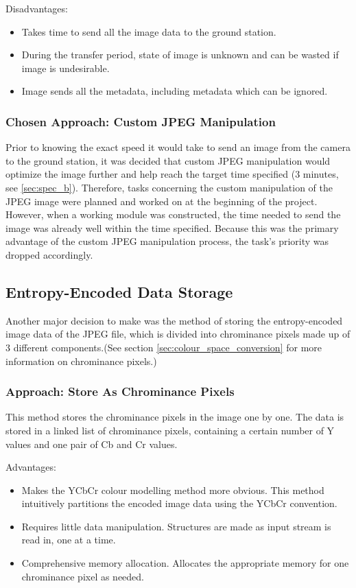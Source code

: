 Disadvantages:
\begin{itemize}
	\item Takes time to send all the image data to the ground station.
	\item During the transfer period, state of image is unknown and 
		can be wasted if image is undesirable.
	\item Image sends all the metadata, including 
		metadata which can be ignored.
\end{itemize}

\subsubsection{Chosen Approach: Custom JPEG Manipulation}

Prior to knowing the exact speed it would take to send 
an image from the camera to the ground station, 
it was decided that custom JPEG manipulation would optimize 
the image further and help reach the target time specified (3 minutes, see \ref{sec:spec_b}). 
Therefore, tasks concerning the custom manipulation of 
the JPEG image were planned and worked on 
at the beginning of the project. 
However, when a working module was constructed, the time needed to 
send the image was already well within the time specified. 
Because this was the primary advantage of the 
custom JPEG manipulation process, 
the task's priority was dropped accordingly.

\subsection{Entropy-Encoded Data Storage}

Another major decision to make was the method of 
storing the entropy-encoded image data of the JPEG file, 
which is divided into chrominance pixels made up of 
3 different components.(See section 
\ref{sec:colour_space_conversion} for
more information on chrominance pixels.)

\subsubsection{Approach: Store As Chrominance Pixels}

This method stores the chrominance pixels in 
the image one by one. 
The data is stored in a linked list of chrominance pixels, 
containing a certain number of Y values and 
one pair of Cb and Cr values.

Advantages:
\begin{itemize}
	\item Makes the YCbCr colour modelling method 
		more obvious. 
		This method intuitively partitions the 
		encoded image data using the YCbCr convention.
	\item Requires little data manipulation. 
		Structures are made as input stream is read in, 
		one at a time.
	\item Comprehensive memory allocation. 
		Allocates the appropriate memory for 
		one chrominance pixel as needed.
\end{itemize}

